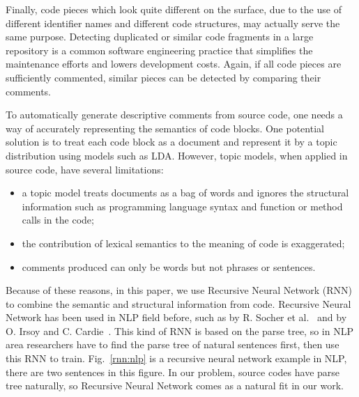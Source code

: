 Finally, code pieces which look quite different on the surface, due to
the use of different identifier names and different code structures,
may actually serve the same purpose.
Detecting duplicated or similar code fragments in a large repository
is a common software engineering practice that simplifies the maintenance
efforts and lowers development costs. Again, if all code pieces are sufficiently
commented, similar pieces can be detected by comparing their comments.

To automatically generate descriptive comments from source code, 
one needs a way of accurately representing the semantics of code blocks. 
One potential solution is to treat each code block as a document
and represent it by a topic distribution using models such as LDA. 
However, topic models, when applied in source code, 
have several limitations:

\begin{itemize}
\item a topic model treats documents as a bag of words and ignores the
structural information such as programming language syntax and
function or method calls in the code;
\item the contribution of lexical semantics to the meaning of code
is exaggerated;
\item comments produced can only be words but not phrases or sentences.
\end{itemize}



Because of these reasons, in this paper, we use Recursive Neural Network (RNN) to combine the semantic and structural information from code.
Recursive Neural Network has been used in NLP field before, such as by
R. Socher et al.~\cite{socher2011parsing, socher2011semi} and by
O. Irsoy and C. Cardie~\cite{irsoy2014deep}.
This kind of RNN is based on the parse tree, so in NLP area researchers have to find the parse tree of natural sentences first, then use this RNN to train. Fig.~\ref{rnn:nlp} is a recursive neural network example in NLP, there are two sentences in this figure. In our problem, source codes have parse tree naturally, so Recursive Neural Network comes as a natural fit in our work.

